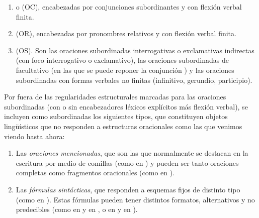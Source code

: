 \begin{enumerate}[label=(\alph*)]
  \item {} o 
        (OC), encabezadas por conjunciones subordinantes y con flexión verbal
        finita.
  \item {} (OR), encabezadas por
        pronombres relativos y con flexión verbal finita.
  \item {}
        (OS). Son las oraciones subordinadas interrogativas o exclamativas
        indirectas (con foco interrogativo o exclamativo), las oraciones
        subordinadas de  facultativo (en las que se puede reponer la
        conjunción ) y las oraciones subordinadas con formas verbales
        no finitas (infinitivo, gerundio, participio).
\end{enumerate}

\begin{recuadro}
Por fuera de las regularidades estructurales marcadas para las oraciones
subordinadas (con o sin encabezadores léxicos explícitos más flexión verbal), se
incluyen como subordinadas los siguientes tipos, que constituyen objetos
lingüísticos que no responden a estructuras oracionales como las que venimos
viendo hasta ahora:

\begin{enumerate}[label=(\alph*)]
  \item Las \textit{oraciones mencionadas}, que son las que normalmente se
        destacan en la escritura por medio de comillas (como en ) y pueden ser tanto oraciones completas como fragmentos
        oracionales (como en ).
  \item Las \textit{fórmulas sintácticas}, que responden a esquemas fijos de
        distinto tipo (como en ). Estas fórmulas pueden tener distintos formatos, alternativos
        y no predecibles (como en  y en , o en
         y en
        ).
\end{enumerate}
\end{recuadro}

